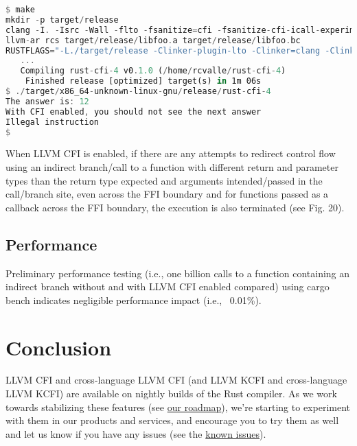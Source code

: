 \documentclass{article}
\begin{document}
\begin{lstlisting}[language=Rust, caption={Build and execution of Figs. 17–18 with LLVM CFI enabled.}]
$ make
mkdir -p target/release
clang -I. -Isrc -Wall -flto -fsanitize=cfi -fsanitize-cfi-icall-experimental-normalize-integers -fvisibility=hidden -c -emit-llvm src/foo.c -o target/release/libfoo.bc
llvm-ar rcs target/release/libfoo.a target/release/libfoo.bc
RUSTFLAGS="-L./target/release -Clinker-plugin-lto -Clinker=clang -Clink-arg=-fuse-ld=lld -Zsanitizer=cfi -Zsanitizer-cfi-normalize-integers" cargo build -Zbuild-std -Zbuild-std-features --release --target x86_64-unknown-linux-gnu
   ...
   Compiling rust-cfi-4 v0.1.0 (/home/rcvalle/rust-cfi-4)
    Finished release [optimized] target(s) in 1m 06s
$ ./target/x86_64-unknown-linux-gnu/release/rust-cfi-4
The answer is: 12
With CFI enabled, you should not see the next answer
Illegal instruction
$
\end{lstlisting}

When LLVM CFI is enabled, if there are any attempts to redirect control flow using an indirect branch/call to a function with different return and parameter types than the return type expected and arguments intended/passed in the call/branch site, even across the FFI boundary and for functions passed as a callback across the FFI boundary, the execution is also terminated (see Fig. 20).

\subsection{Performance}

Preliminary performance testing (i.e., one billion calls to a function containing an indirect branch without and with LLVM CFI enabled compared) using cargo bench indicates negligible performance impact (i.e., ~0.01\%).


\section{Conclusion}

LLVM CFI and cross-language LLVM CFI (and LLVM KCFI and cross-language LLVM KCFI) are available on nightly builds of the Rust compiler. As we work towards stabilizing these features (see \href{https://hackmd.io/@rcvalle/S1Ou9K6H6}{our roadmap}), we’re starting to experiment with them in our products and services, and encourage you to try them as well and let us know if you have any issues (see the \href{https://github.com/rust-lang/rust/issues?q=is:open+label:PG-exploit-mitigations+CFI}{known issues}).
\end{document}
